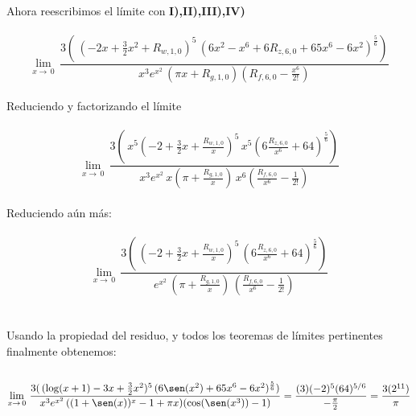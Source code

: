 \documentclass[11pt,letterpaper]{article}
\begin{document}
\newpage
\,\\
Ahora reescribimos el l\'imite con \textbf{I),II),III),IV)}\,\\
\,\\
\begin{equation*}
    \displaystyle\lim_{x\rightarrow\,0}\,\frac{3(\,(-2x+\frac{3}{2}x^2+R_{w,1,0})^5\,(6x^2-x^6+6R_{z,6,0}+65x^6-6x^2)^{\frac{5}{6}})}{x^3e^{x^2}\,(\pi x+R_{g,1,0})(R_{f,6,0}-\frac{x^6}{2!})}
\end{equation*}\,\\
Reduciendo y factorizando el l\'imite\,\\
\,\\
\begin{equation*}
    \displaystyle\lim_{x\rightarrow\,0}\,\frac{3\left(\,x^5\left(-2+\frac{3}{2}x+\frac{R_{w,1,0}}{x}\right)^5\,x^5\left(6\frac{R_{z,6,0}}{x^6}+64\right)^{\frac{5}{6}}\right)}{x^3e^{x^2}\,x\left(\pi +\frac{R_{g,1,0}}{x}\right)\,x^6\left(\frac{R_{f,6,0}}{x^6}-\frac{1}{2!}\right)}
\end{equation*}\,\\
Reduciendo a\'un m\'as:\,\\
\,\\
\begin{equation*}
    \displaystyle\lim_{x\rightarrow\,0}\,\frac{3\left(\,\left(-2+\frac{3}{2}x+\frac{R_{w,1,0}}{x}\right)^5\,\left(6\frac{R_{z,6,0}}{x^6}+64\right)^{\frac{5}{6}}\right)}{e^{x^2}\,\left(\pi +\frac{R_{g,1,0}}{x}\right)\,\left(\frac{R_{f,6,0}}{x^6}-\frac{1}{2!}\right)}
\end{equation*}\,\\
\,\\
Usando la propiedad del residuo, y todos los teoremas de l\'imites pertinentes finalmente obtenemos:\,\\
\,\\
\begin{equation*}
    \displaystyle\lim_{x\rightarrow\,0}\,\frac{3(\,(\log(x+1)-3x+\frac{3}{2}x^2)^5\,(6\sen(x^2)+65x^6-6x^2)^{\frac{5}{6}})}{x^3e^{x^2}\,((1+\sen(x))^x-1+\pi x)(\cos(\sen(x^3))-1)}=\frac{(3)(-2)^5(64)^{5/6}}{-\frac{\pi}{2}}=\frac{3(2^{11})}{\pi}
\end{equation*}
\end{document}
